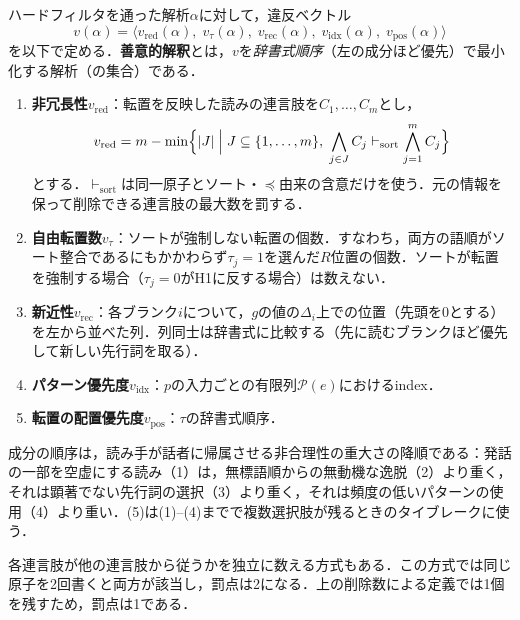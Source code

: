 \documentclass[../../main-detail.tex]{subfiles}
\begin{document}
\begin{definition}[ランキング]
    ハードフィルタを通った解析$\alpha$に対して，違反ベクトル
    \[
        v(\alpha) = \langle v_{\mathrm{red}}(\alpha),\; v_{\tau}(\alpha),\; v_{\mathrm{rec}}(\alpha),\; v_{\mathrm{idx}}(\alpha),\; v_{\mathrm{pos}}(\alpha)\rangle
    \]
    を以下で定める．\textbf{善意的解釈}とは，$v$を\emph{辞書式順序}（左の成分ほど優先）で最小化する解析（の集合）である．
    \begin{enumerate}[label=(\arabic*)]
        \item \textbf{非冗長性}$v_{\mathrm{red}}$：転置を反映した読みの連言肢を$C_1,\ldots,C_m$とし，
        \[
            v_{\mathrm{red}}=m-\min\Bigl\{|J|\;\Big|\; J\subseteq\{1,\ldots,m\},\;
            \bigwedge_{j\in J}C_j\vdash_{\mathrm{sort}}\bigwedge_{j=1}^{m}C_j\Bigr\}
        \]
        とする．$\vdash_{\mathrm{sort}}$は同一原子とソート・$\preceq$由来の含意だけを使う．元の情報を保って削除できる連言肢の最大数を罰する．
        \item \textbf{自由転置数}$v_{\tau}$：ソートが強制しない転置の個数．すなわち，両方の語順がソート整合であるにもかかわらず$\tau_j = 1$を選んだ$R$位置の個数．ソートが転置を強制する場合（$\tau_j = 0$がH1に反する場合）は数えない．
        \item \textbf{新近性}$v_{\mathrm{rec}}$：各ブランク$i$について，$g$の値の$\Delta_i$上での位置（先頭を$0$とする）を左から並べた列．列同士は辞書式に比較する（先に読むブランクほど優先して新しい先行詞を取る）．
        \item \textbf{パターン優先度}$v_{\mathrm{idx}}$：$p$の入力ごとの有限列$\mathcal{P}(e)$におけるindex．
        \item \textbf{転置の配置優先度}$v_{\mathrm{pos}}$：$\tau$の辞書式順序．
    \end{enumerate}
    成分の順序は，読み手が話者に帰属させる非合理性の重大さの降順である：発話の一部を空虚にする読み（1）は，無標語順からの無動機な逸脱（2）より重く，それは顕著でない先行詞の選択（3）より重く，それは頻度の低いパターンの使用（4）より重い．(5)は(1)--(4)までで複数選択肢が残るときのタイブレークに使う．
\end{definition}
\begin{remark}[連言肢ごとの冗長性]
    各連言肢が他の連言肢から従うかを独立に数える方式もある．この方式では同じ原子を2回書くと両方が該当し，罰点は2になる．上の削除数による定義では1個を残すため，罰点は1である．
\end{remark}
\end{document}
